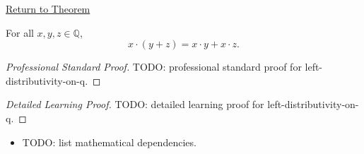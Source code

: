 \newpage
{}
\label{prf:left-distributivity-on-q}

\begin{remark*}[Return]
\hyperref[thm:left-distributivity-on-q]{Return to Theorem}
\end{remark*}

\begin{theorem*}
For all $x,y,z\in\mathbb{Q}$,
\[
x\cdot(y+z)=x\cdot y+x\cdot z.
\]
\end{theorem*}

\begin{proof}[Professional Standard Proof]
\LRAProofBodyStart
TODO: professional standard proof for left-distributivity-on-q.
\end{proof}

\begin{proof}[Detailed Learning Proof]
\LRAProofBodyStart
TODO: detailed learning proof for left-distributivity-on-q.
\end{proof}

\begin{remark*}
\end{remark*}

\begin{dependencies}
\begin{itemize}
  \item TODO: list mathematical dependencies.
\end{itemize}
\end{dependencies}

\clearpage
